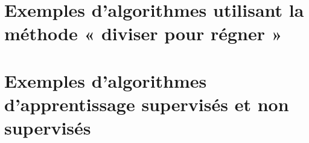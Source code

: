 %
%
%
%
%
%
%
%
%
%
%
%
\chapter{Exemples d’algorithmes utilisant la méthode « diviser pour régner »}
\label{L13}
	
%
%

\chapter{Exemples d’algorithmes d’apprentissage supervisés et non supervisés} \label{L15}


%
 


